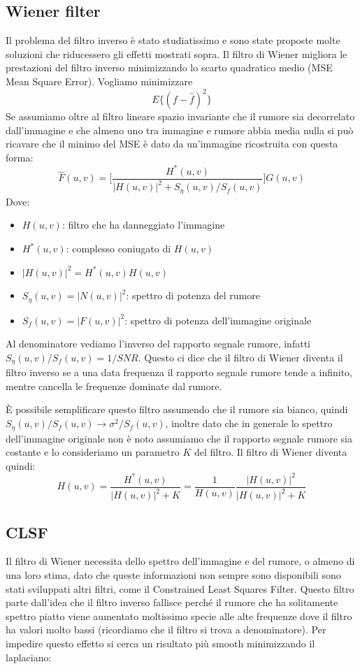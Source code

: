 \subsection{Wiener filter}
Il problema del filtro inverso è stato studiatissimo e sono state proposte molte soluzioni che riducessero gli effetti mostrati sopra. Il filtro di Wiener migliora le prestazioni del filtro inverso minimizzando lo scarto quadratico medio (MSE Mean Square Error). Vogliamo minimizzare
\begin{equation}
	E\Big\{(f-\hat{f})^2\Big\}
\end{equation}
Se assumiamo oltre al filtro lineare spazio invariante che il rumore sia decorrelato dall'immagine e che almeno uno tra immagine e rumore abbia media nulla si può ricavare che il minimo del MSE è dato da un'immagine ricostruita con questa forma:
\begin{equation}
	\hat{F}(u,v) = \Bigg[\frac{H^*(u,v)}{|H(u,v)|^2 + S_{\eta}(u,v) / S_f(u,v)}\Bigg]G(u,v)
\end{equation}
Dove:
\begin{itemize}
	\item $H(u,v)$: filtro che ha danneggiato l'immagine
	\item $H^*(u,v)$: complesso coniugato di $H(u,v)$
	\item $|H(u,v)|^2 = H^*(u,v) H(u,v)$
	\item $S_{\eta}(u,v) = |N(u,v)|^2$: spettro di potenza del rumore
	\item $S_f(u,v) = |F(u,v)|^2$: spettro di potenza dell'immagine originale
\end{itemize}
\newpage
Al denominatore vediamo l'inverso del rapporto segnale rumore, infatti $S_{\eta}(u,v) / S_f(u,v) = 1/SNR$. Questo ci dice che il filtro di Wiener diventa il filtro inverso se a una data frequenza il rapporto segnale rumore tende a infinito, mentre cancella le frequenze dominate dal rumore.

È possibile semplificare questo filtro assumendo che il rumore sia bianco, quindi $S_{\eta}(u,v) / S_f(u,v) \rightarrow \sigma^2/ S_f(u,v)$, inoltre dato che in generale lo spettro dell'immagine originale non è noto assumiamo che il rapporto segnale rumore sia costante e lo consideriamo un parametro $K$ del filtro. Il filtro di Wiener diventa quindi:
\begin{equation}
	H(u,v) = \frac{H^*(u,v)}{|H(u,v)|^2 +K} = \frac{1}{H(u,v)}\frac{|H(u,v)|^2}{|H(u,v)|^2 +K} 
\end{equation}

\subsection{CLSF}
Il filtro di Wiener necessita dello spettro dell'immagine e del rumore, o almeno di una loro stima, dato che queste informazioni non sempre sono disponibili sono stati sviluppati altri filtri, come il Constrained Least Squares Filter. Questo filtro parte dall'idea che il filtro inverso fallisce perché il rumore che ha solitamente spettro piatto viene aumentato moltissimo specie alle alte frequenze dove il filtro ha valori molto bassi (ricordiamo che il filtro si trova a denominatore). Per impedire questo effetto si cerca un risultato più smooth minimizzando il laplaciano:

